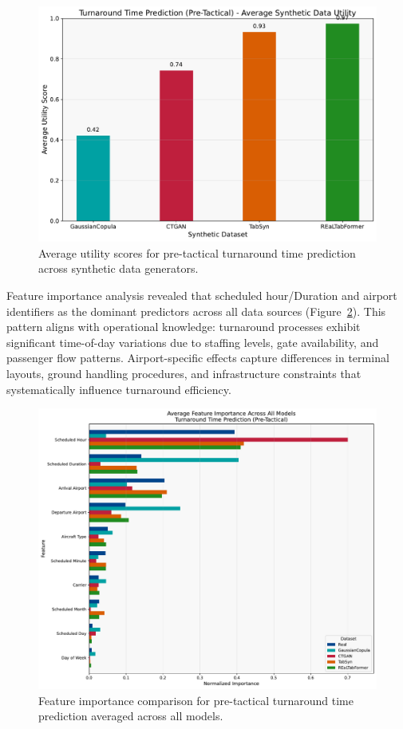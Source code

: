 \documentclass[conference]{IEEEtran}
\begin{document}
\begin{figure}[htbp]
    \centering
    \includegraphics[width=0.8\linewidth]{plots/turnaround_min_pre-tactical/turnaround_min_pre-tactical_avg_utility.pdf}
    \caption{Average utility scores for pre-tactical turnaround time prediction across synthetic data generators.}
    \label{fig:turnaround_pre_utility}
\end{figure}

Feature importance analysis revealed that scheduled hour/Duration and airport identifiers as the dominant predictors across all data sources (Figure~\ref{fig:turnaround_pre_features}). This pattern aligns with operational knowledge: turnaround processes exhibit significant time-of-day variations due to staffing levels, gate availability, and passenger flow patterns. Airport-specific effects capture differences in terminal layouts, ground handling procedures, and infrastructure constraints that systematically influence turnaround efficiency.

\begin{figure}[htbp]
    \centering
    \includegraphics[width=\linewidth]{plots/turnaround_min_pre-tactical/feature_importances/turnaround_min_pre-tactical_all_models_feature_comparison.pdf}
    \caption{Feature importance comparison for pre-tactical turnaround time prediction averaged across all models.}
    \label{fig:turnaround_pre_features}
\end{figure}
\end{document}
